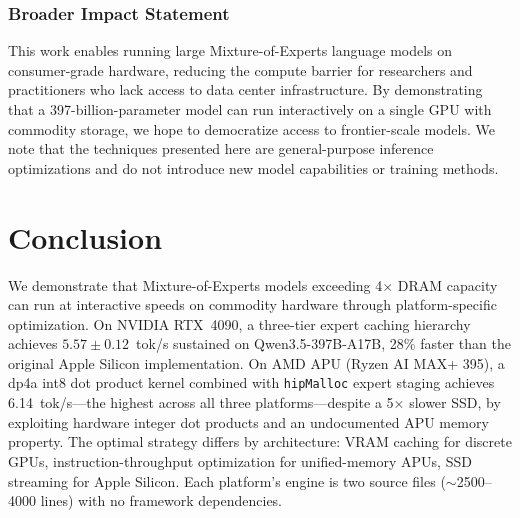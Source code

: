 \documentclass[10pt]{article}
\begin{document}
\subsubsection*{Broader Impact Statement}

This work enables running large Mixture-of-Experts language models on consumer-grade hardware, reducing the compute barrier for researchers and practitioners who lack access to data center infrastructure. By demonstrating that a 397-billion-parameter model can run interactively on a single GPU with commodity storage, we hope to democratize access to frontier-scale models. We note that the techniques presented here are general-purpose inference optimizations and do not introduce new model capabilities or training methods.

\section{Conclusion}

We demonstrate that Mixture-of-Experts models exceeding 4$\times$ DRAM capacity can run at interactive speeds on commodity hardware through platform-specific optimization. On NVIDIA RTX~4090, a three-tier expert caching hierarchy achieves $5.57 \pm 0.12$~tok/s sustained on Qwen3.5-397B-A17B, 28\% faster than the original Apple Silicon implementation. On AMD APU (Ryzen AI MAX+ 395), a dp4a int8 dot product kernel combined with \texttt{hipMalloc} expert staging achieves 6.14~tok/s---the highest across all three platforms---despite a 5$\times$ slower SSD, by exploiting hardware integer dot products and an undocumented APU memory property. The optimal strategy differs by architecture: VRAM caching for discrete GPUs, instruction-throughput optimization for unified-memory APUs, SSD streaming for Apple Silicon. Each platform's engine is two source files ($\sim$2500--4000 lines) with no framework dependencies.



\end{document}

